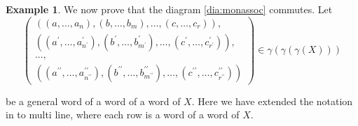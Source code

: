 \documentclass[11pt,a4paper]{article}
\theoremstyle{definition}
\newtheorem{example}[thm]{Example}
\numberwithin{equation}{section}
\begin{document}
\begin{example}
    We now prove that the diagram \eqref{dia:monassoc} commutes.
    Let 
    \[\begin{pmatrix}
        ((a,\dots, a_n),(b,\dots ,b_m),\dots,(c,\dots, c_r)), \\
        ((a^\prime,\dots, a^\prime_{n^\prime}),(b^\prime,\dots, b^\prime_{m^\prime}),\dots,(c^\prime,\dots, c^\prime_{r^\prime})), \\
        \dots, \\
        ((a^{\prime\prime},\dots, a^{\prime\prime}_{n^{\prime\prime}}),(b^{\prime\prime},\dots ,b^{\prime\prime}_{m^{\prime\prime}}),\dots,(c^{\prime\prime},\dots, c^{\prime\prime}_{r^{\prime\prime}}))
    \end{pmatrix}\in \gamma(\gamma(\gamma(X)))\]
    
    be a general word of a word of a word of $X$. Here we have extended the notation in to multi line, where each row is a word of a word of $X$.
    

\end{example}
\end{document}
